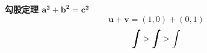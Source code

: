 \documentclass[nofonts]{ctexart}
\begin{document}
\textbf{勾股定理 $ \bm{a^2 + b^2 = c^2} $}
\[
	\bm{u} + \bm{v} = (1, 0) + (0, 1)
\]
\[
	\hm\int > \bm\int > \int 
\]
\end{document}
